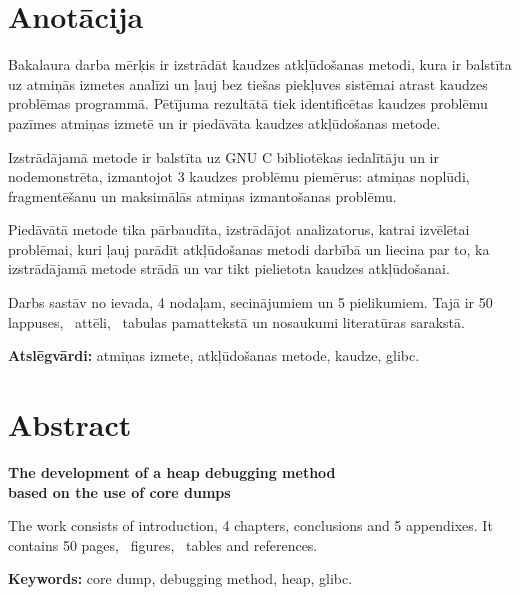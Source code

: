 \chapter*{Anotācija}
\thispagestyle{empty}

Bakalaura darba mērķis ir izstrādāt kaudzes atkļūdošanas metodi, kura ir balstīta uz atmiņās izmetes analīzi un ļauj bez tiešas piekļuves sistēmai atrast kaudzes problēmas programmā.
Pētījuma rezultātā tiek identificētas kaudzes problēmu pazīmes atmiņas izmetē un ir piedāvāta kaudzes atkļūdošanas metode.

Izstrādājamā metode ir balstīta uz GNU C bibliotēkas iedalītāju un ir nodemonstrēta, izmantojot 3 kaudzes problēmu piemērus: atmiņas noplūdi, fragmentēšanu un maksimālās atmiņas izmantošanas problēmu.

Piedāvātā metode tika pārbaudīta, izstrādājot analizatorus, katrai izvēlētai problēmai, kuri ļauj parādīt atkļūdošanas metodi darbībā un liecina par to, ka izstrādājamā metode strādā un var tikt pielietota kaudzes atkļūdošanai.



Darbs sastāv no ievada, 4 nodaļam, secinājumiem un 5 pielikumiem. Tajā ir 50 lappuses, \totfig\ attēli, \tottab\ tabulas pamattekstā un  nosaukumi literatūras sarakstā.

\textbf{Atslēgvārdi:} atmiņas izmete, atkļūdošanas metode, kaudze, glibc.

\newpage

\chapter*{Abstract}
\begin{center}
\linespread{1.2}
\vspace{-0.3cm}
\large \textbf {The development of a heap debugging method \protect\\  based on the use of core dumps}
\end{center}

\thispagestyle{empty}
	The work consists of introduction, 4 chapters, conclusions and 5 appendixes. It contains 50 pages, \totfig\ figures, \tottab\ tables and  references.

\textbf{Keywords:} core dump, debugging method, heap, glibc.


\newpage 






